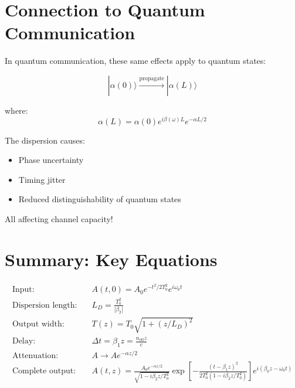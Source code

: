 \documentclass[12pt]{article}
\begin{document}
\section{Connection to Quantum Communication}

In quantum communication, these same effects apply to quantum states:

\begin{equation}
|\alpha(0)\rangle \xrightarrow{\text{propagate}} |\alpha(L)\rangle
\end{equation}

where:
\begin{equation}
\alpha(L) = \alpha(0) e^{i\beta(\omega)L} e^{-\alpha L/2}
\end{equation}

The dispersion causes:
\begin{itemize}
\item Phase uncertainty
\item Timing jitter
\item Reduced distinguishability of quantum states
\end{itemize}

All affecting channel capacity!

\section{Summary: Key Equations}

\begin{align}
\text{Input:} \quad & A(t,0) = A_0 e^{-t^2/2T_0^2} e^{i\omega_0 t} \\[0.3cm]
\text{Dispersion length:} \quad & L_D = \frac{T_0^2}{|\beta_2|} \\[0.3cm]
\text{Output width:} \quad & T(z) = T_0\sqrt{1 + (z/L_D)^2} \\[0.3cm]
\text{Delay:} \quad & \Delta t = \beta_1 z = \frac{n_{\text{eff}} z}{c} \\[0.3cm]
\text{Attenuation:} \quad & A \to A e^{-\alpha z/2} \\[0.3cm]
\text{Complete output:} \quad & A(t,z) = \frac{A_0 e^{-\alpha z/2}}{\sqrt{1-i\beta_2 z/T_0^2}} \exp\left[-\frac{(t-\beta_1 z)^2}{2T_0^2(1-i\beta_2 z/T_0^2)}\right] e^{i(\beta_0 z - \omega_0 t)}
\end{align}
\end{document}
